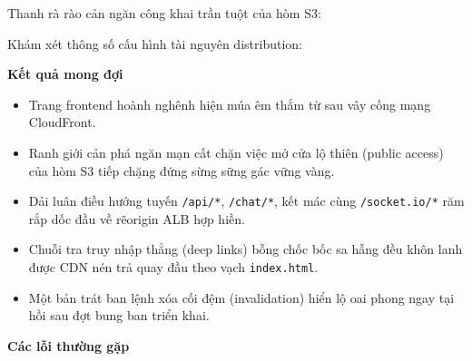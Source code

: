 Thanh rà rào cản ngăn công khai trần tuột của hòm S3:

\begin{Shaded}
\begin{Highlighting}[]
\DataTypeTok{\textbackslash{}}
  \OperatorTok{\textless{}}\OperatorTok{\textgreater{}}
\end{Highlighting}
\end{Shaded}

Khám xét thông số cấu hình tài nguyên distribution:

\begin{Shaded}
\begin{Highlighting}[]
\end{Highlighting}
\end{Shaded}

\vspace{0.5em}\noindent\textbf{Kết quả mong đợi}\par

\begin{itemize}
\tightlist
\item
  Trang frontend hoành nghênh hiện múa êm thắm từ sau vây cống mạng
  CloudFront.
\item
  Ranh giới cản phá ngăn mạn cất chặn việc mở cửa lộ thiên (public
  access) của hòm S3 tiếp chặng đứng sừng sững gác vững vàng.
\item
  Dải luân điều hướng tuyến \texttt{/\allowbreak{}api/\allowbreak{}*}, \texttt{/\allowbreak{}chat/\allowbreak{}*}, kết mác
  cùng \texttt{/\allowbreak{}socket.\allowbreak{}io/\allowbreak{}*} răm rắp dốc đầu về rẽorigin ALB hợp hiền.
\item
  Chuỗi tra truy nhập thẳng (deep links) bỗng chốc bốc sa hẫng đều khôn
  lanh được CDN nén trả quay đầu theo vạch \texttt{index.\allowbreak{}html}.
\item
  Một bản trát ban lệnh xóa cối đệm (invalidation) hiển lộ oai phong
  ngay tại hồi sau đợt bung ban triển khai.
\end{itemize}

\vspace{0.5em}\noindent\textbf{Các lỗi thường
gặp}\par

